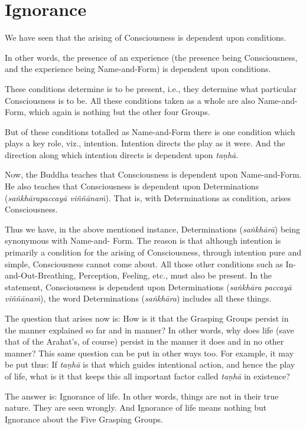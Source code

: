 \chapter{Ignorance}

We have seen that the arising of Consciousness is dependent upon conditions.

In other words, the presence of an experience (the presence being Consciousness, and the experience being Name-and-Form) is dependent upon conditions.

These conditions determine  is to be present, i.e., they determine what particular Consciousness is to be. All these conditions taken as a whole are also Name-and-Form, which again is nothing but the other four Groups.

But of these conditions totalled as Name-and-Form there is one condition which plays a key role, viz., intention. Intention directs the play as it were. And the direction along which intention directs is dependent upon \emph{taṇhā}.

Now, the Buddha teaches that Consciousness is dependent upon Name-and-Form. He also teaches that Consciousness is dependent upon Determinations (\emph{saṅkhārapaccayā viññānaṁ}). That is, with Determinations as condition, arises Consciousness.

Thus we have, in the above mentioned instance, Determinations (\emph{saṅkhārā}) being synonymous with Name-and- Form. The reason is that although intention is primarily a condition for the arising of Consciousness, through intention  pure and simple, Consciousness cannot come about. All those other conditions such as In-and-Out-Breathing, Perception, Feeling, etc., must also be present. In the statement, Consciousness is dependent upon Determinations (\emph{saṅkhāra paccayā viññānaṁ}), the word Determinations (\emph{saṅkhāra}) includes all these things.

The question that arises now is: How is it that the Grasping Groups persist in the manner explained so far and in  manner? In other words, why does life (save that of the Arahat's, of course) persist in the manner it does and in no other manner? This same question can be put in other ways too. For example, it may be put thus: If \emph{taṇhā} is that which guides intentional action, and hence the play of life, what is it that keeps this all important factor called \emph{taṇhā} in existence?

The answer is: Ignorance of life. In other words, things are not  in their true nature. They are seen wrongly. And Ignorance of life means nothing but Ignorance about the Five Grasping Groups.

